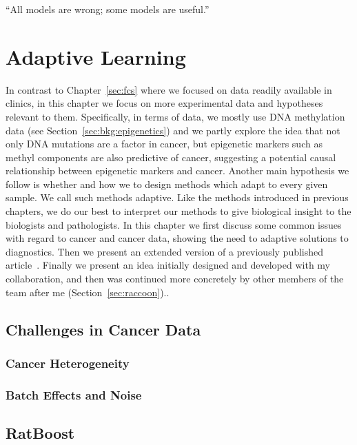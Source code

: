 \begin{savequote}[.5\linewidth]
  ``All models are wrong; some models are useful.''
\end{savequote}

\chapter{Adaptive Learning}
\label{sec:adaptive-learning}

In contrast to Chapter~\ref{sec:fcs} where we focused on data readily available in clinics, in this chapter we focus on more experimental data and hypotheses relevant to them. Specifically, in terms of data, we mostly use DNA methylation data (see Section~\ref{sec:bkg:epigenetics}) and we partly explore the idea that not only DNA mutations are a factor in cancer, but epigenetic markers such as methyl components are also predictive of cancer, suggesting a potential causal relationship between epigenetic markers and cancer. Another main hypothesis we follow is whether and how we to design methods which adapt to every given sample. We call such methods adaptive. Like the methods introduced in previous chapters, we do our best to interpret our methods to give biological insight to the biologists and pathologists. In this chapter we first discuss some common issues with regard to cancer and cancer data, showing the need to adaptive solutions to diagnostics. Then we present an extended version of a previously published article~\cite{jalali2016interpretable}. Finally we present an idea initially designed and developed with my collaboration, and then was continued more concretely by other members of the team after me (Section~\ref{sec:raccoon})..

\section{Challenges in Cancer Data}
\subsection{Cancer Heterogeneity}

\subsection{Batch Effects and Noise}

\section{RatBoost}
\label{chap:ratboost-chapter}
